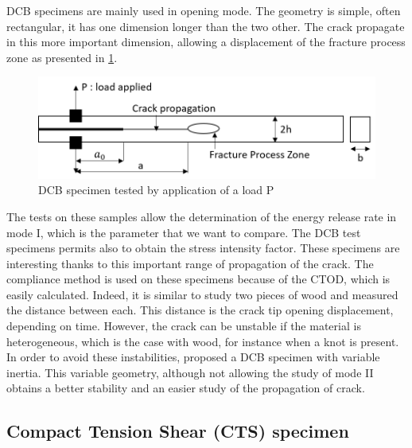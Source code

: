DCB specimens are mainly used in opening mode. The geometry is simple, often rectangular, it has one dimension longer than the two other. The crack propagate in this more important dimension, allowing a displacement of the fracture process zone as presented in \ref{fig:DCB}.
\begin{figure}[h]
	\centering
	\includegraphics{Figures/DCB}
	\decoRule
	\caption[DCB specimen]{DCB specimen tested by application of a load P}
	\label{fig:DCB}
\end{figure}
The tests on these samples allow the determination of the energy release rate in mode I, which is the parameter that we want to compare. The DCB test specimens permits also to obtain the stress intensity factor.
These specimens are interesting thanks to this important range of propagation of the crack. The compliance method is used on these specimens because of the CTOD, which is easily calculated. Indeed, it is similar to study two pieces of wood and measured the distance between each. This distance is the crack tip opening displacement, depending on time. However, the crack can be unstable if the material is heterogeneous, which is the case with wood, for instance when a knot is present. In order to avoid these instabilities, \parencite{Reference10} proposed a DCB specimen with variable inertia.
This variable geometry, although not allowing the study of mode II obtains a better stability and an easier study of the propagation of crack.

\subsection{ Compact Tension Shear (CTS) specimen}

